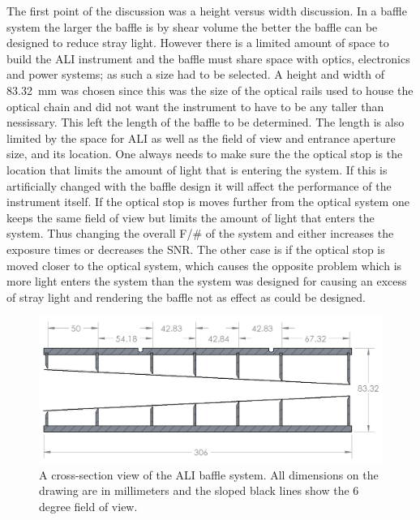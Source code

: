 The first point of the discussion was a height versus width discussion. In a baffle system the larger the baffle is by shear volume the better the baffle can be designed to reduce stray light. However there is a limited amount of space to build the ALI instrument and the baffle must share space with optics, electronics and power systems; as such a size had to be selected. A height and width of 83.32~mm was chosen since this was the size of the optical rails used to house the optical chain and did not want the instrument to have to be any taller than nessissary. This left the length of the baffle to be determined. The length is also limited by the space for ALI as well as the field of view and entrance aperture size, and its location. One always needs to make sure the the optical stop is the location that limits the amount of light that is entering the system. If this is artificially changed with the baffle design it will affect the performance of the instrument itself. If the optical stop is moves further from the optical system one keeps the same field of view but limits the amount of light that enters the system. Thus changing the overall F/\# of the system and either increases the exposure times or decreases the SNR. The other case is if the optical stop is moved closer to the optical system, which causes the opposite problem which is more light enters the system than the system was designed for causing an excess of stray light and rendering the baffle not as effect as could be designed.

\begin{figure}[h!]
        \includegraphics[width=1.0\textwidth]{./Images/3-3-BaffleAssembly.png}
        \caption[ALI Baffle Cross Section]{A cross-section view of the ALI baffle system. All dimensions on the drawing are
        in millimeters and the sloped black lines show the 6 degree field of view.}
        \label{fig:3.3:aliBaffleCrossSection}
\end{figure}


